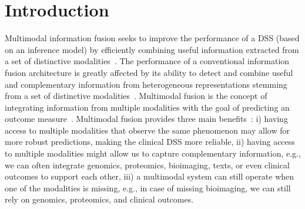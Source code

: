 \section{Introduction}
\label{secIntroduction_Motivation}
Multimodal information fusion seeks to improve the performance of a DSS (based on an inference model) by efficiently combining useful information extracted from a set of distinctive modalities~\cite{mmdcae}. The performance of a conventional information fusion architecture is greatly affected by its ability to detect and combine useful and complementary information from heterogeneous representations stemming from a set of distinctive modalities~\cite{ito2018effects}. Multimodal fusion is the concept of integrating information from multiple modalities with the goal of predicting an outcome measure~\cite{mmsurvey,mmdcae}. Multimodal fusion provides three main benefits~\cite{mmsurvey}: i) having access to multiple modalities that observe the same phenomenon may allow for more robust predictions, making the clinical DSS more reliable, ii) having access to multiple modalities might allow us to capture complementary information, e.g., we can often integrate genomics, proteomics, bioimaging, texts, or even clinical outcomes to support each other, iii) a multimodal system can still operate when one of the modalities is missing, e.g., in case of missing bioimaging, we can still rely on genomics, proteomics, and clinical outcomes.

